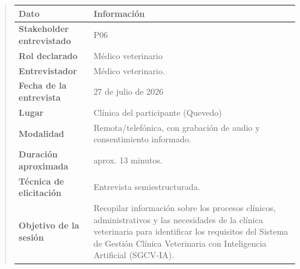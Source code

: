 \documentclass[
]{article}
\newcounter{none} %
\begin{document}
\begin{quote}
{\def\LTcaptype{none} %
\begin{longtable}[]{|
  >{\raggedright\arraybackslash}p{}|
  >{\raggedright\arraybackslash}p{}|}
\hline
\begin{minipage}[b]{\linewidth}\centering
\textbf{Dato}
\end{minipage} & \begin{minipage}[b]{\linewidth}\centering
\textbf{Información}
\end{minipage} \\
\hline
\endhead
\hline
\endlastfoot
\textbf{Stakeholder entrevistado} & \begin{minipage}[t]{\linewidth}\raggedright
P06
\end{minipage} \\
\hline
\textbf{Rol declarado} & \begin{minipage}[t]{\linewidth}\raggedright
Médico veterinario
\end{minipage} \\
\hline
\textbf{Entrevistador} & \begin{minipage}[t]{\linewidth}\raggedright
Médico veterinario.
\end{minipage} \\
\hline
\textbf{Fecha de la entrevista} & \begin{minipage}[t]{\linewidth}\raggedright
27 de julio de 2026
\end{minipage} \\
\hline
\textbf{Lugar} & \begin{minipage}[t]{\linewidth}\raggedright
Clínica del participante (Quevedo)
\end{minipage} \\
\hline
\textbf{Modalidad} & \begin{minipage}[t]{\linewidth}\raggedright
Remota/telefónica, con grabación de audio y consentimiento informado.
\end{minipage} \\
\hline
\textbf{Duración aproximada} & \begin{minipage}[t]{\linewidth}\raggedright
aprox. 13 minutos.
\end{minipage} \\
\hline
\textbf{Técnica de elicitación} & \begin{minipage}[t]{\linewidth}\raggedright
Entrevista semiestructurada.
\end{minipage} \\
\hline
\textbf{Objetivo de la sesión} & \begin{minipage}[t]{\linewidth}\raggedright
Recopilar información sobre los procesos clínicos, administrativos y las necesidades de la clínica veterinaria para identificar los requisitos del Sistema de Gestión Clínica Veterinaria con Inteligencia Artificial (SGCV-IA).
\end{minipage} \\
\hline
\end{longtable}
}


\end{quote}
\end{document}
